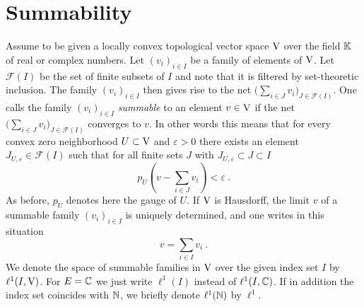 %
\section{Summability}
\label{sec:summability}
\begin{definition}
Assume to be given a locally convex topological vector space $\mathrm{V}$ over the field $\mathbb{K}$ of real or complex numbers.
Let $(v_i)_{i \in I}$ be a family of elements of $\mathrm{V}$. Let $\mathscr{F} (I)$ be the
set of finite subsets of $I$ and note that it is filtered by set-theoretic inclusion. 
The family  $(v_i)_{i \in I}$ then gives rise to the net 
$\Big( \sum_{i \in J} v_i \Big)_{J \in \mathscr{F}(I)}$. One calls the family  $(v_i)_{i \in I}$
\emph{summable} to an element $v \in \mathrm{V}$ if the net 
$\Big( \sum_{i \in J} v_i \Big)_{J \in \mathscr{F}(I)}$ converges to $v$. In other words this means that 
for every convex zero neighborhood $U \subset \mathrm{V}$ and $\varepsilon >0$ there exists an element
$J_{U,\varepsilon} \in \mathscr{F} (I)$ such that for all finite sets $J$ with $ J_{U,\varepsilon} \subset J \subset I$
\[
   p_U \left( v - \sum_{i \in J} v_i \right) < \varepsilon \ .
\]
As before, $p_U$ denotes here the gauge of $U$. 
If $\mathrm{V}$ is Hausdorff, the limit $v$ of a summable family  $(v_i)_{i \in I}$ is
uniquely determined, and one  writes in this situation
\[
   v = \sum_{i \in I} v_i \ .  
\]
We denote the space of summable families in $\mathrm{V}$ over the given index set $I$ by 
$\ell^1 (I ,\mathrm{V})$. For $E=\mathbb{C}$ we just write $\ell^1 (I )$ instead of $\ell^1 (I ,\mathbb{C})$. If in addition the index set 
coincides with $\mathbb{N}$, we briefly denote $\ell^1 (\mathbb{N} )$ by $\ell^1$.
\end{definition}


